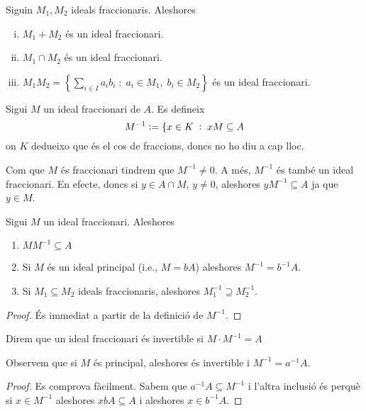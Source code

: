 \documentclass[../../../main.tex]{subfiles}
\begin{document}
\begin{prop}
Siguin $M_1,M_2$ ideals fraccionaris. Aleshores
\begin{enumerate}[(i)]
    \item $M_1+M_2$ és un ideal fraccionari.
    \item $M_1\cap M_2$ és un ideal fraccionari.
    \item $M_1M_2 = \left\{\sum_{i\in I}a_ib_i\;:\;a_i\in M_1,\;b_i\in M_2\right\}$ és un ideal fraccionari.
\end{enumerate}
\end{prop}

\begin{defi}
[Invers de $M$]\label{def:inversM} Sigui $M$ un ideal fraccionari de $A$. Es defineix
\begin{equation}
    \notag
    M^{-1}:=\{x\in K\;:\;xM\subseteq A
\end{equation}
on $K$ dedueixo que és el cos de fraccions, doncs no ho diu a cap lloc.
\end{defi}

Com que $M$ és fraccionari tindrem que $M^{-1}\neq 0$. A més, $M^{-1}$ és també un ideal fraccionari. En efecte, doncs si $y\in A\cap M$, $y\neq 0$, aleshores $yM^{-1}\subseteq A$ ja que $y\in M$.

\begin{prop}
Sigui $M$ un ideal fraccionari. Aleshores
\begin{enumerate}[(1)]
    \item $MM^{-1}\subseteq A$
    \item Si $M$ és un ideal principal (i.e., $M = bA$) aleshores $M^{-1} = b^{-1}A$.
    \item Si $M_1\subseteq M_2$ ideals fraccionaris, aleshores $M_1^{-1}\supseteq M_2^{-1}$.
\end{enumerate}
\end{prop}
\begin{proof}
És immediat a partir de la definició de $M^{-1}$.
\end{proof}

\begin{defi}
\label{def:idealFraccionariInvertible} Direm que un ideal fraccionari és invertible si $M\cdotp M^{-1} = A$
\end{defi}

\begin{nota}
Observem que si $M$ és principal, aleshores és invertible i $M^{-1} = a^{-1}A$.
\end{nota}
\begin{proof}
    Es comprova fàcilment. Sabem que $a^{-1}A\subseteq M^{-1}$ i l'altra inclusió és perquè si $x\in M^{-1}$ aleshores $xbA\subseteq A$ i aleshores $x\in b^{-1}A$.
\end{proof}
\end{document}
